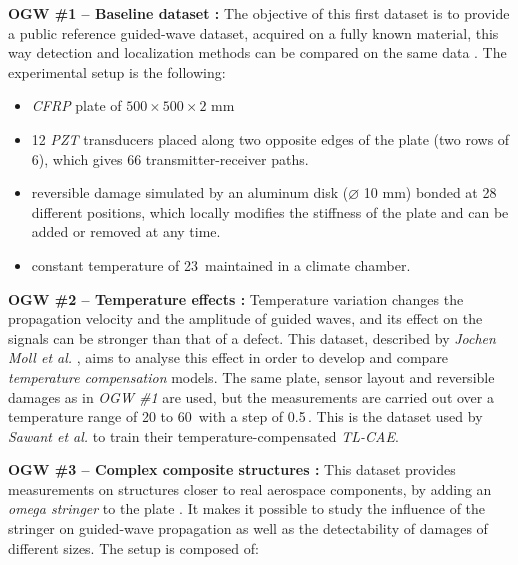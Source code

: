 \documentclass[12pt]{article}
\begin{document}
\textbf{OGW \#1 -- Baseline dataset : } The objective of this first dataset is to provide a public reference guided-wave dataset, acquired on a fully known material, this way detection and localization methods can be compared on the same data \cite{moll2019ogw}. The experimental setup is the following:
 
\begin{itemize}[itemsep=4pt]

    \item \textit{CFRP} plate of $500 \times 500 \times 2$ mm
    
    \item 12 \textit{PZT} transducers placed along two opposite edges of the plate (two rows of 6), which gives 66 transmitter-receiver paths.
    
    \item reversible damage simulated by an aluminum disk ($\varnothing$ 10 mm) bonded at 28 different positions, which locally modifies the stiffness of the plate and can be added or removed at any time.
    
    \item constant temperature of 23\,\celsius{} maintained in a climate chamber.

\end{itemize}

\textbf{OGW \#2 -- Temperature effects : } Temperature variation changes the propagation velocity and the amplitude of guided waves, and its effect on the signals can be stronger than that of a defect. This dataset, described by \textit{Jochen Moll et al.} \cite{moll2019temperature, moll2019temperature_data}, aims to analyse this effect in order to develop and compare \textit{temperature compensation} models. The same plate, sensor layout and reversible damages as in \textit{OGW \#1} are used, but the measurements are carried out over a temperature range of 20 to 60\,\celsius{} with a step of 0.5\,\celsius. This is the dataset used by \textit{Sawant et al.} \cite{SAWANT2023106931} to train their temperature-compensated \textit{TL-CAE}.

\textbf{OGW \#3 -- Complex composite structures : } This dataset provides measurements on structures closer to real aerospace components, by adding an \textit{omega stringer} to the plate \cite{moll2020stringer}. It makes it possible to study the influence of the stringer on guided-wave propagation as well as the detectability of damages of different sizes. The setup is composed of:
\end{document}
